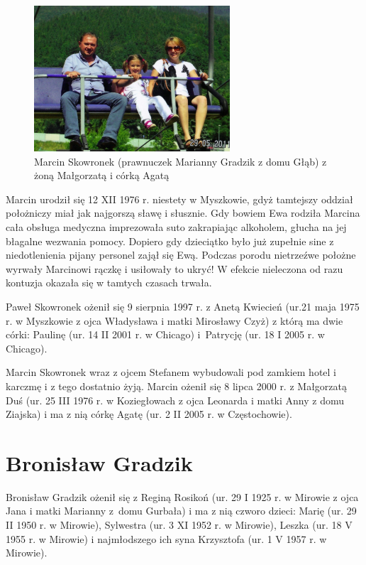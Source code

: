 \begin{figure}[!b]
\begin{center}
\includegraphics[width=0.65\textwidth]{zdjecia/malgorzata_marcin_agata_skowronek.jpg}
\caption[Rodzina Marcina Skowronka]{Marcin Skowronek (prawnuczek Marianny Gradzik z domu Głąb) z żoną Małgorzatą i córką Agatą}
\label{rys:malgorzata_marcin_agata_skowronek}
\end{center}
\end{figure}

Marcin urodził się 12 XII 1976 r. niestety w Myszkowie, gdyż tamtejszy oddział położniczy miał jak najgorszą sławę i słusznie. Gdy bowiem Ewa rodziła Marcina cała obsługa medyczna imprezowała suto zakrapiając alkoholem, głucha na jej błagalne wezwania pomocy. Dopiero gdy dzieciątko było już zupełnie sine z niedotlenienia pijany personel zajął się Ewą. Podczas porodu nietrzeźwe położne wyrwały Marcinowi rączkę i usiłowały to ukryć! W efekcie nieleczona od razu kontuzja okazała się w tamtych czasach  trwała.

Paweł Skowronek ożenił się 9 sierpnia 1997 r. z Anetą Kwiecień (ur.21 maja 1975 r. w Myszkowie z ojca Władysława i matki Mirosławy Czyż) z którą ma dwie córki: Paulinę (ur. 14 II 2001 r. w Chicago) i~Patrycję  (ur. 18 I 2005 r. w Chicago).

Marcin Skowronek wraz z ojcem Stefanem wybudowali pod zamkiem hotel i karczmę i z tego dostatnio żyją. Marcin ożenił się 8 lipca 2000 r. z Małgorzatą Duś (ur. 25  III 1976 r. w Koziegłowach z ojca Leonarda i matki Anny z domu Ziajska) i ma z nią córkę Agatę (ur. 2 II 2005 r. w Częstochowie).


\section{Bronisław Gradzik}
Bronisław Gradzik ożenił się z Reginą Rosikoń (ur. 29 I 1925 r. w Mirowie z ojca Jana i matki Marianny z~domu Gurbała) i ma z nią czworo dzieci: Marię (ur. 29 II 1950 r. w Mirowie), Sylwestra (ur. 3 XI 1952 r. w Mirowie), Leszka (ur. 18 V 1955 r. w Mirowie) i najmłodszego ich syna Krzysztofa (ur. 1 V 1957 r. w Mirowie). 

